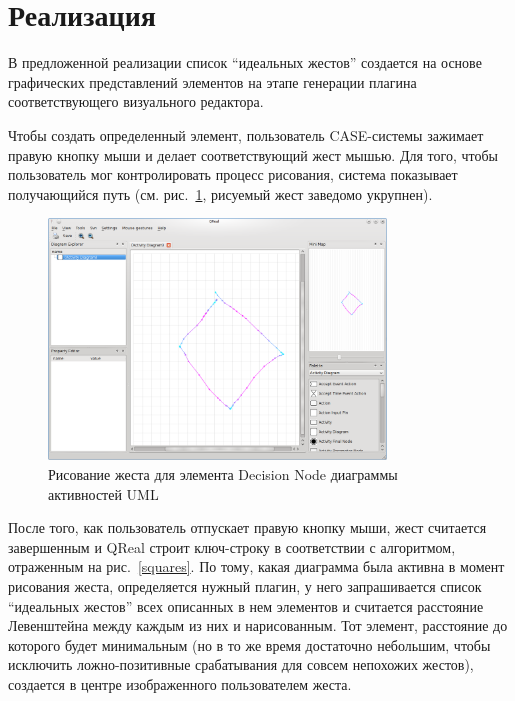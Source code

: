 \documentclass[a5paper]{article}
\begin{document}
\section{Реализация}

В предложенной реализации список ``идеальных жестов'' создается на основе графических представлений элементов на этапе генерации плагина соответствующего
визуального редактора.

Чтобы создать определенный элемент, пользователь CASE-системы зажимает правую кнопку мыши и делает соответствующий жест мышью. 
Для того, чтобы пользователь мог контролировать процесс рисования, система показывает получающийся путь (см. рис.~\ref{drawing}, 
рисуемый жест заведомо укрупнен).

\begin{figure} [ht]
  \begin{center}
    \includegraphics[width=0.8\textwidth, bb=0 0 800 600]{05-drawing.png}
    \caption{Рисование жеста для элемента Decision Node диаграммы активностей UML}
    \label{drawing}
  \end{center}
\end{figure}

После того, как пользователь отпускает правую кнопку мыши, жест считается завершенным и QReal строит ключ-строку в соответствии с алгоритмом,
отраженным на рис.~\ref{squares}. По тому, какая диаграмма была активна в момент рисования жеста, определяется нужный плагин, у него 
запрашивается список ``идеальных жестов'' всех описанных в нем элементов и считается расстояние Левенштейна между каждым из них и нарисованным. 
Тот элемент, расстояние до которого будет минимальным (но в то же время достаточно небольшим, чтобы исключить ложно-позитивные срабатывания 
для совсем непохожих жестов), создается в центре изображенного пользователем жеста. 
\end{document}
